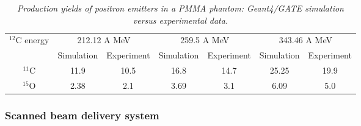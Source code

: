 \documentclass[11pt]{iopart}
\begin{document}
\begin{table}[htbp]
\begin{center}
\begin{tabular}{|c|c|c|c|c|c|c|} \hline
$^{12}$C energy  & \multicolumn{2}{|c|}{212.12 A MeV}  & \multicolumn{2}{|c|}{259.5 A MeV}  & \multicolumn{2}{|c|}{343.46 A MeV}       \\
\cline{2-7} 
                 &  Simulation           &  Experiment                  & Simulation & Experiment  & Simulation & Experiment     \\ \hline \hline
 
 $^{11}$C             & 11.9  &  10.5  &  16.8  &  14.7  &  25.25  &  19.9                          \\ \hline
  $^{15}$O             & 2.38  &  2.1  &  3.69  &  3.1   &  6.09   &  5.0                        \\ \hline \hline 

\end{tabular}
\end{center} 
\caption{\it Production yields of positron emitters in a PMMA phantom: Geant4/GATE simulation versus experimental data.}
\label{tab:CrossSection}
\end{table}



\subsubsection{Scanned beam delivery system}
\end{document}

